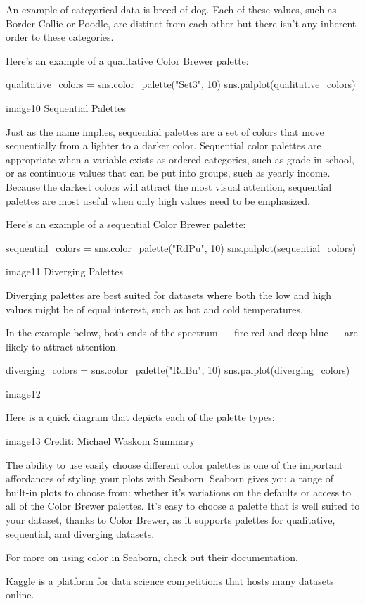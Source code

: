 \documentclass{journal}
\begin{document}
An example of categorical data is breed of dog. Each of these values, such as Border Collie or Poodle, are distinct from each other but there isn’t any inherent order to these categories.

Here’s an example of a qualitative Color Brewer palette:

qualitative_colors = sns.color_palette("Set3", 10)
sns.palplot(qualitative_colors)

image10
Sequential Palettes

Just as the name implies, sequential palettes are a set of colors that move sequentially from a lighter to a darker color. Sequential color palettes are appropriate when a variable exists as ordered categories, such as grade in school, or as continuous values that can be put into groups, such as yearly income. Because the darkest colors will attract the most visual attention, sequential palettes are most useful when only high values need to be emphasized.

Here’s an example of a sequential Color Brewer palette:

sequential_colors = sns.color_palette("RdPu", 10)
sns.palplot(sequential_colors)

image11
Diverging Palettes

Diverging palettes are best suited for datasets where both the low and high values might be of equal interest, such as hot and cold temperatures.

In the example below, both ends of the spectrum — fire red and deep blue — are likely to attract attention.

diverging_colors = sns.color_palette("RdBu", 10)
sns.palplot(diverging_colors)

image12

Here is a quick diagram that depicts each of the palette types:

image13
Credit: Michael Waskom
Summary

The ability to use easily choose different color palettes is one of the important affordances of styling your plots with Seaborn. Seaborn gives you a range of built-in plots to choose from: whether it’s variations on the defaults or access to all of the Color Brewer palettes. It’s easy to choose a palette that is well suited to your dataset, thanks to Color Brewer, as it supports palettes for qualitative, sequential, and diverging datasets.

For more on using color in Seaborn, check out their documentation.


Kaggle is a platform for data science competitions that hosts many datasets online.
\end{document}
